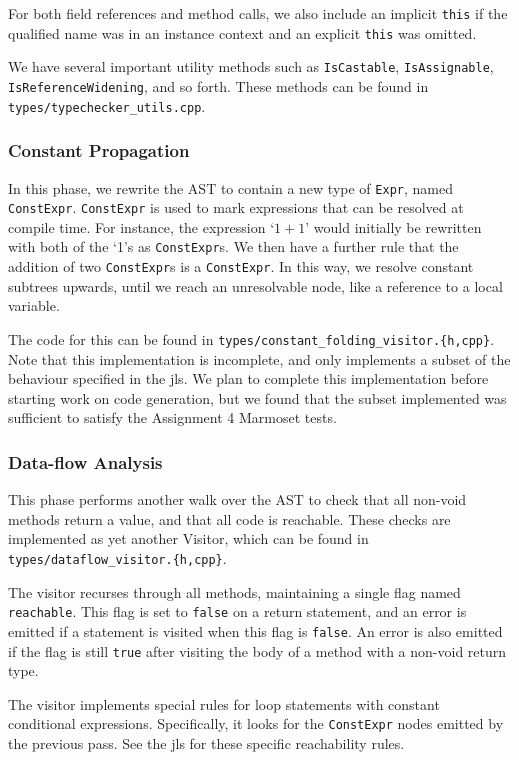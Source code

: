 \documentclass[12pt, titlepage]{article}
\newcommand{\z}[1]{\texttt{#1}}
\begin{document}
For both field references and method calls, we also include an implicit \z{this}
if the qualified name was in an instance context and an explicit \z{this} was
omitted.

We have several important utility methods such as \z{IsCastable},
\z{IsAssignable}, \z{IsReferenceWidening}, and so forth. These methods can be
found in \z{types/typechecker\_utils.cpp}.

\subsubsection{Constant Propagation}\label{subsubsec:const-prop}

In this phase, we rewrite the AST to contain a new type of \z{Expr}, named
\z{ConstExpr}. \z{ConstExpr} is used to mark expressions that can be resolved
at compile time. For instance, the expression `$1 + 1$' would initially be
rewritten with both of the `1's as \z{ConstExpr}s. We then have a further rule
that the addition of two \z{ConstExpr}s is a \z{ConstExpr}. In this way, we
resolve constant subtrees upwards, until we reach an unresolvable node, like a
reference to a local variable.

The code for this can be found in
\z{types/constant\_folding\_visitor.\{h,cpp\}}.  Note that this implementation
is incomplete, and only implements a subset of the behaviour specified in the
\ac{jls}. We plan to complete this implementation before starting work on code
generation, but we found that the subset implemented was sufficient to satisfy
the Assignment 4 Marmoset tests.

\subsubsection{Data-flow Analysis}\label{subsubsec:data-flow}

This phase performs another walk over the AST to check that all non-void
methods return a value, and that all code is reachable. These checks are
implemented as yet another Visitor, which can be found in
\z{types/dataflow\_visitor.\{h,cpp\}}.

The visitor recurses through all methods, maintaining a single flag named
\z{reachable}. This flag is set to \z{false} on a return statement, and an error is
emitted if a statement is visited when this flag is \z{false}. An error is also
emitted if the flag is still \z{true} after visiting the body of a method with
a non-void return type.

The visitor implements special rules for loop statements with constant
conditional expressions. Specifically, it looks for the \z{ConstExpr} nodes
emitted by the previous pass. See the \ac{jls} for these specific reachability
rules.
\end{document}
